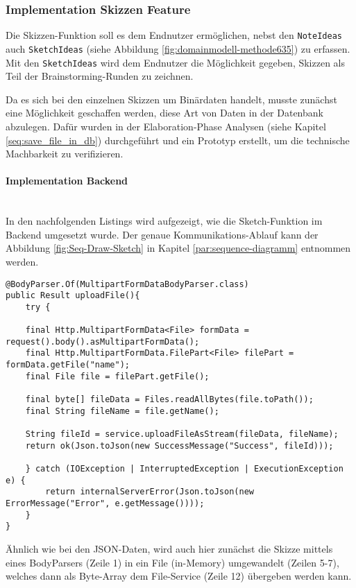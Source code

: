 \subsubsection{Implementation Skizzen Feature}
Die Skizzen-Funktion soll es dem Endnutzer ermöglichen, nebst den \texttt{NoteIdeas} auch \texttt{SketchIdeas} (siehe Abbildung \ref{fig:domainmodell-methode635}) zu erfassen. Mit den \texttt{SketchIdeas} wird dem Endnutzer die Möglichkeit gegeben, Skizzen als Teil der Brainstorming-Runden zu zeichnen.

Da es sich bei den einzelnen Skizzen um Binärdaten handelt, musste zunächst eine Möglichkeit geschaffen werden, diese Art von Daten in der Datenbank abzulegen. Dafür wurden in der Elaboration-Phase Analysen (siehe Kapitel \ref{seq:save_file_in_db}) durchgeführt und ein Prototyp erstellt, um die technische Machbarkeit zu verifizieren.

\paragraph*{Implementation Backend}~\\
In den nachfolgenden Listings wird aufgezeigt, wie die Sketch-Funktion im Backend umgesetzt wurde.
Der genaue Kommunikations-Ablauf kann der Abbildung \ref{fig:Seq-Draw-Sketch} in Kapitel \ref{par:sequence-diagramm} entnommen werden.

\begin{lstlisting}[caption={Upload File im File Controller}, label=uploadFileController]
@BodyParser.Of(MultipartFormDataBodyParser.class)
public Result uploadFile(){
    try {

    final Http.MultipartFormData<File> formData = request().body().asMultipartFormData();
    final Http.MultipartFormData.FilePart<File> filePart = formData.getFile("name");
    final File file = filePart.getFile();

    final byte[] fileData = Files.readAllBytes(file.toPath());
    final String fileName = file.getName();

    String fileId = service.uploadFileAsStream(fileData, fileName);
    return ok(Json.toJson(new SuccessMessage("Success", fileId)));

    } catch (IOException | InterruptedException | ExecutionException  e) {
        return internalServerError(Json.toJson(new ErrorMessage("Error", e.getMessage())));
    }
}
\end{lstlisting}

Ähnlich wie bei den JSON-Daten, wird auch hier zunächst die Skizze mittels eines BodyParsers (Zeile 1) in ein File (in-Memory) umgewandelt (Zeilen 5-7), welches dann als Byte-Array dem File-Service (Zeile 12) übergeben werden kann. 

